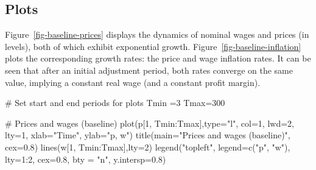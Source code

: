 \documentclass[
  letterpaper,
  DIV=11,
  numbers=noendperiod]{scrreprt}
\newenvironment{Shaded}{\begin{snugshade}}{\end{snugshade}}
\newcommand{\AttributeTok}[1]{\textcolor[rgb]{0.40,0.45,0.13}{#1}}
\newcommand{\CommentTok}[1]{\textcolor[rgb]{0.37,0.37,0.37}{#1}}
\newcommand{\DecValTok}[1]{\textcolor[rgb]{0.68,0.00,0.00}{#1}}
\newcommand{\FloatTok}[1]{\textcolor[rgb]{0.68,0.00,0.00}{#1}}
\newcommand{\FunctionTok}[1]{\textcolor[rgb]{0.28,0.35,0.67}{#1}}
\newcommand{\NormalTok}[1]{\textcolor[rgb]{0.00,0.23,0.31}{#1}}
\newcommand{\OtherTok}[1]{\textcolor[rgb]{0.00,0.23,0.31}{#1}}
\newcommand{\SpecialCharTok}[1]{\textcolor[rgb]{0.37,0.37,0.37}{#1}}
\newcommand{\StringTok}[1]{\textcolor[rgb]{0.13,0.47,0.30}{#1}}
\begin{document}
\subsection{Plots}\label{plots-7}

Figure~\ref{fig-baseline-prices} displays the dynamics of nominal wages
and prices (in levels), both of which exhibit exponential growth.
Figure~\ref{fig-baseline-inflation} plots the corresponding growth
rates: the price and wage inflation rates. It can be seen that after an
initial adjustment period, both rates converge on the same value,
implying a constant real wage (and a constant profit margin).

\begin{Shaded}
\begin{Highlighting}[]
\CommentTok{\# Set start and end periods for plots}
\NormalTok{Tmin }\OtherTok{=}\DecValTok{3}
\NormalTok{Tmax}\OtherTok{=}\DecValTok{300}

\CommentTok{\# Prices and wages (baseline)}
\FunctionTok{plot}\NormalTok{(p[}\DecValTok{1}\NormalTok{, Tmin}\SpecialCharTok{:}\NormalTok{Tmax],}\AttributeTok{type=}\StringTok{"l"}\NormalTok{, }\AttributeTok{col=}\DecValTok{1}\NormalTok{, }\AttributeTok{lwd=}\DecValTok{2}\NormalTok{, }\AttributeTok{lty=}\DecValTok{1}\NormalTok{, }\AttributeTok{xlab=}\StringTok{"Time"}\NormalTok{, }\AttributeTok{ylab=}\StringTok{"p, w"}\NormalTok{) }
\FunctionTok{title}\NormalTok{(}\AttributeTok{main=}\StringTok{"Prices and wages (baseline)"}\NormalTok{, }\AttributeTok{cex=}\FloatTok{0.8}\NormalTok{)}
\FunctionTok{lines}\NormalTok{(w[}\DecValTok{1}\NormalTok{, Tmin}\SpecialCharTok{:}\NormalTok{Tmax],}\AttributeTok{lty=}\DecValTok{2}\NormalTok{)}
\FunctionTok{legend}\NormalTok{(}\StringTok{"topleft"}\NormalTok{, }\AttributeTok{legend=}\FunctionTok{c}\NormalTok{(}\StringTok{"p"}\NormalTok{, }\StringTok{"w"}\NormalTok{),}
       \AttributeTok{lty=}\DecValTok{1}\SpecialCharTok{:}\DecValTok{2}\NormalTok{, }\AttributeTok{cex=}\FloatTok{0.8}\NormalTok{, }\AttributeTok{bty =} \StringTok{"n"}\NormalTok{, }\AttributeTok{y.intersp=}\FloatTok{0.8}\NormalTok{)}
\end{Highlighting}
\end{Shaded}
\end{document}
